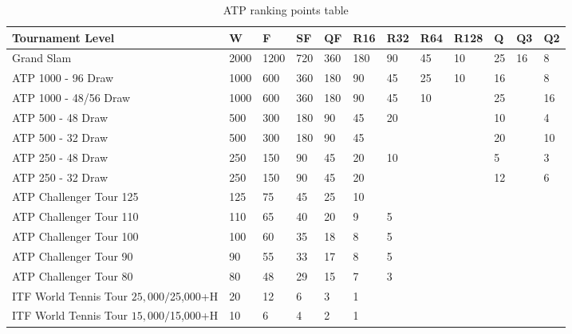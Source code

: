 \documentclass[12pt]{article}
\begin{document}
\begin{table}[ht]
  \caption{ATP ranking points table}
  \label{tab:ATP}
\centering
\begin{tabular}{
  |p{}
  |p{}
  |p{}
  |p{}
  |p{}
  |p{}
  |p{}
  |p{}
  |p{}
  |p{}
  |p{}
  |p{}|
  }
  \hline
Tournament Level & W & F & SF & QF & R16 & R32 & R64 & R128 & Q & Q3 & Q2\\ 
  \hline
Grand Slam & 2000 & 1200 & 720 & 360 & 180 & 90 & 45 & 10 & 25 & 16 & 8 \\ 
\hline
ATP 1000 - 96 Draw & 1000 & 600 & 360 & 180 & 90 & 45 & 25 & 10 & 16 &  & 8\\ 
\hline
ATP 1000 - 48/56 Draw & 1000 & 600 & 360 & 180 & 90 & 45 & 10 &  & 25 &  & 16\\
\hline
ATP 500 - 48 Draw & 500 & 300 & 180 & 90 & 45 & 20 &  &  & 10 &  & 4\\ 
\hline
ATP 500 - 32 Draw & 500 & 300 & 180 & 90 & 45 &  &  &  & 20 &  & 10\\ 
\hline
ATP 250 - 48 Draw & 250 & 150 & 90 & 45 & 20 & 10 &  &  & 5 &  & 3\\
\hline
ATP 250 - 32 Draw & 250 & 150 & 90 & 45 & 20 &  &  &  & 12 &  & 6\\
\hline
ATP Challenger Tour 125 & 125 & 75 & 45 & 25 & 10 & & & & & & \\
\hline
ATP Challenger Tour 110 & 110 & 65 & 40 & 20 & 9 & 5 & & & & & \\
\hline
ATP Challenger Tour 100 & 100 & 60 & 35 & 18 & 8 & 5 & & & & & \\
\hline
ATP Challenger Tour 90 & 90 & 55 & 33 & 17 & 8 & 5 & & & & & \\
\hline
ATP Challenger Tour 80 & 80 & 48 & 29 & 15 & 7 & 3 & & & & & \\
\hline
ITF World Tennis Tour $25,000 / $25,000+H & 20 & 12 & 6 & 3 & 1 & & & & & & \\
\hline
ITF World Tennis Tour $15,000 / $15,000+H & 10 & 6 & 4 & 2 & 1 & & & & & & \\
  \hline
\end{tabular}
\end{table} 
\end{document}
